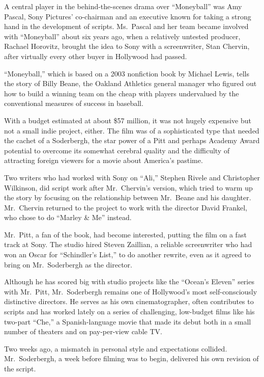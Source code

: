 ﻿\documentclass[12pt]{article}
\begin{document}
A central player in the behind-the-scenes drama over ``Moneyball'' was Amy Pascal, Sony Pictures'
co-chairman and an executive known for taking a strong hand in the development of scripts.
Ms.~Pascal and her team became involved with ``Moneyball'' about six years ago, when a relatively
untested producer, Rachael Horovitz, brought the idea to Sony with a screenwriter, Stan Chervin,
after virtually every other buyer in Hollywood had passed.

``Moneyball,'' which is based on a 2003 nonfiction book by Michael Lewis, tells the story of Billy
Beane, the Oakland Athletics general manager who figured out how to build a winning team on the
cheap with players undervalued by the conventional measures of success in baseball.

With a budget estimated at about \$57 million, it was not hugely expensive but not a small indie
project, either. The film was of a sophisticated type that needed the cachet of a Soderbergh, the
star power of a Pitt and perhaps Academy Award potential to overcome its somewhat cerebral quality
and the difficulty of attracting foreign viewers for a movie about America's pastime.

Two writers who had worked with Sony on ``Ali,'' Stephen Rivele and Christopher Wilkinson, did
script work after Mr.~Chervin's version, which tried to warm up the story by focusing on the
relationship between Mr.~Beane and his daughter. Mr.~Chervin returned to the project to work with
the director David Frankel, who chose to do ``Marley \& Me'' instead.

Mr.~Pitt, a fan of the book, had become interested, putting the film on a fast track at Sony. The
studio hired Steven Zaillian, a reliable screenwriter who had won an Oscar for ``Schindler's List,''
to do another rewrite, even as it agreed to bring on Mr.~Soderbergh as the director.

Although he has scored big with studio projects like the ``Ocean's Eleven'' series with Mr.~Pitt,
Mr.~Soderbergh remains one of Hollywood's most self-consciously distinctive directors. He serves as
his own cinematographer, often contributes to scripts and has worked lately on a series of
challenging, low-budget films like his two-part ``Che,'' a Spanish-language movie that made its
debut both in a small number of theaters and on pay-per-view cable TV.

Two weeks ago, a mismatch in personal style and expectations collided. Mr.~Soderbergh, a week before
filming was to begin, delivered his own revision of the script.
\end{document}
